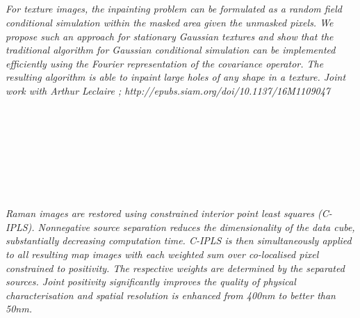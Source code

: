 \begin{multicols}{2}
\\ 
        \\
        \\\\
        \\
        \\\\
        \\
        \\\\
        \\
        \\\\
\\
      \textit{For texture images, the inpainting problem can be formulated as a random field conditional simulation within the masked area given the unmasked pixels.
We propose such an approach for stationary Gaussian textures and show that the traditional algorithm for Gaussian conditional simulation can be implemented efficiently using the Fourier representation of the covariance operator. 
The resulting algorithm is able to inpaint large holes of any shape in a texture.
Joint work with Arthur Leclaire ; http://epubs.siam.org/doi/10.1137/16M1109047}\\
\\ 
        \\
        \\\\
        \\
        \\\\
\\
      \textit{Raman images are restored using constrained interior point least squares (C-IPLS). Nonnegative source separation reduces the dimensionality of the data cube, substantially decreasing computation time. C-IPLS is then simultaneously applied to all resulting map images with each weighted sum over co-localised pixel constrained to positivity. The respective weights are determined by the separated sources. Joint positivity significantly improves the quality of physical characterisation and spatial resolution is enhanced from 400nm to better than 50nm.}\\
\\ 

\end{multicols}
